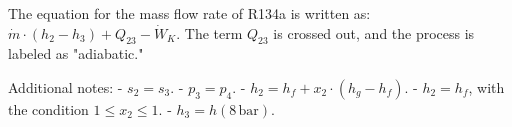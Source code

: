 The equation for the mass flow rate of R134a is written as:  
\( \dot{m} \cdot (h_2 - h_3) + Q_{23} - \dot{W}_K \).  
The term \( Q_{23} \) is crossed out, and the process is labeled as "adiabatic."  

Additional notes:  
- \( s_2 = s_3 \).  
- \( p_3 = p_4 \).  
- \( h_2 = h_f + x_2 \cdot (h_g - h_f) \).  
- \( h_2 = h_f \), with the condition \( 1 \leq x_2 \leq 1 \).  
- \( h_3 = h(8 \, \text{bar}) \).